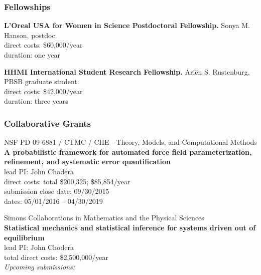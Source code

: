 \documentclass[10pt]{article}
\begin{document}
\subsubsection*{Fellowships}

{\bf L'Oreal USA for Women in Science Postdoctoral Fellowship.}  Sonya M. Hanson, postdoc.\\
direct costs: \$60,000/year\\
duration: one year

\vspace{2ex}

{\bf HHMI International Student Research Fellowship.} Ari\"{e}n S. Rustenburg, PBSB graduate student.\\
direct costs: \$42,000/year\\
duration: three years



\subsubsection*{Collaborative Grants}

NSF PD 09-6881 / CTMC / CHE - Theory, Models, and Computational Methods\\
{\bf A probabilistic framework for automated force field parameterization, refinement, and systematic error quantification}\\
lead PI: John Chodera\\
direct costs: total \$200,325; \$85,854/year\\
submission close date: 09/30/2015\\
dates: 05/01/2016 -- 04/30/2019

\vspace{2ex}

Simons Collaborations in Mathematics and the Physical Sciences\\
{\bf Statistical mechanics and statistical inference for systems driven out of equilibrium}\\
lead PI: John Chodera\\
total direct costs: \$2,500,000/year\\

\vspace{2ex}
\emph{Upcoming submissions:}
\vspace{2ex}
\end{document}
